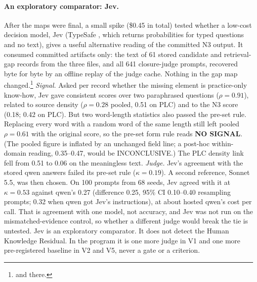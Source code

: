 \paragraph{An exploratory comparator: Jev.} \evobs{} After the maps were final, a small spike
(\$0.45 in total) tested whether a low-cost decision model, Jev (TypeSafe , which returns
probabilities for typed questions and no text), gives a useful alternative reading of the committed N3
output. It consumed committed artifacts only: the text of 61 stored candidate and retrieval-gap records
from the three  files, and all 641 closure-judge prompts, recovered byte for byte by
an offline replay of the judge cache. Nothing in the gap map changed.\footnote{
and  there.} \emph{Signal.} Asked per record whether the missing element is
practice-only know-how, Jev gave consistent scores over two paraphrased questions ($\rho = 0.91$),
related to source density ($\rho = 0.28$ pooled, 0.51 on PLC) and to the N3 score (0.18; 0.42 on PLC).
But two word-length statistics also passed the pre-set rule. Replacing every word with a random word of the same length still left pooled $\rho = 0.61$ with the original score, so the pre-set form rule reads \textbf{NO SIGNAL}. (The pooled figure is inflated by an unchanged field line; a post-hoc within-domain reading, 0.35--0.47, would be INCONCLUSIVE.) The PLC density link fell from 0.51 to 0.06 on the meaningless text. \emph{Judge.} Jev's agreement with the stored qwen answers failed its pre-set rule ($\kappa = 0.19$). A second reference, Sonnet 5.5, was then chosen. On 100 prompts from 68 seeds, Jev agreed with it at $\kappa = 0.53$ against qwen's 0.27 (difference 0.25, 95\% CI 0.10--0.40 resampling prompts; 0.32 when qwen got Jev's instructions), at about hosted qwen's cost per call.
\evint{} That is agreement with one model, not accuracy, and Jev was not run on the mismatched-evidence control, so whether a different judge would break the tie is untested. Jev
is an exploratory comparator. It does not detect the Human Knowledge Residual. In the program it is one
more judge in V1 and one more pre-registered baseline in V2 and V5, never a gate or a criterion.

